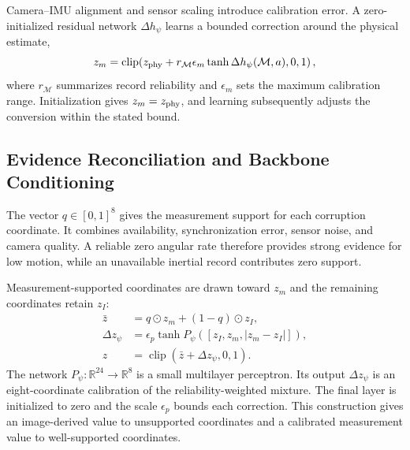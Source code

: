 \documentclass[journal]{IEEEtran}
\begin{document}
Camera--IMU alignment and sensor scaling introduce calibration error. A zero-initialized residual network $\Delta h_\psi$ learns a bounded correction around the physical estimate,
\begin{equation}
z_m=\operatorname{clip}\!\left(z_{\rm phy}+r_{\mathcal M}\epsilon_m\tanh \Delta h_\psi(\mathcal{M},a),0,1\right),
\label{eq:sensorcode}
\end{equation}
where $r_{\mathcal M}$ summarizes record reliability and $\epsilon_m$ sets the maximum calibration range. Initialization gives $z_m=z_{\rm phy}$, and learning subsequently adjusts the conversion within the stated bound.

\subsection{Evidence Reconciliation and Backbone Conditioning}
The vector $q\in[0,1]^8$ gives the measurement support for each corruption coordinate. It combines availability, synchronization error, sensor noise, and camera quality. A reliable zero angular rate therefore provides strong evidence for low motion, while an unavailable inertial record contributes zero support.

Measurement-supported coordinates are drawn toward $z_m$ and the remaining coordinates retain $z_I$:
\begin{equation}
\begin{split}
\bar z &= q\odot z_m+(1-q)\odot z_I,\\
\Delta z_\psi &=\epsilon_p\tanh P_\psi([z_I,z_m,|z_m-z_I|]),\\
z &= \operatorname{clip}(\bar z+\Delta z_\psi,0,1).
\end{split}
\label{eq:posterior}
\end{equation}
The network $P_\psi:\mathbb{R}^{24}\rightarrow\mathbb{R}^{8}$ is a small multilayer perceptron. Its output $\Delta z_\psi$ is an eight-coordinate calibration of the reliability-weighted mixture. The final layer is initialized to zero and the scale $\epsilon_p$ bounds each correction. This construction gives an image-derived value to unsupported coordinates and a calibrated measurement value to well-supported coordinates.
\end{document}
